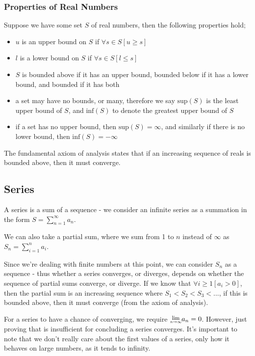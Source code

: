 \documentclass[a4paper, 12pt]{article}
\newcommand{\limit}[2]{\raisebox{0.5ex}{\scalebox{0.8}{$\displaystyle{\lim_{#1 \to #2}}$}}}
\newcommand{\summation}[3]{\sum\limits_{#1}^{#2} #3}
\begin{document}
            \subsubsection*{Properties of Real Numbers}
                Suppose we have some set $S$ of real numbers, then the following properties hold;
                \begin{itemize}
                    \itemsep0em
                    \item $u$ is an upper bound on $S$ if $\forall s \in S [u \geq s]$
                    \item $l$ is a lower bound on $S$ if $\forall s \in S [l \leq s]$
                    \item $S$ is bounded above if it has an upper bound, bounded below if it has a lower bound, and bounded if it has both
                    \item a set may have no bounds, or many, therefore we say $\text{sup}(S)$ is the least upper bound of $S$, and $\text{inf}(S)$ to denote the greatest upper bound of $S$
                    \item if a set has no upper bound, then $\text{sup}(S) = \infty$, and similarly if there is no lower bound, then $\text{inf}(S) = -\infty$
                \end{itemize}
                The fundamental axiom of analysis states that if an increasing sequence of reals is bounded above, then it must converge.
        \subsection*{Series}
            A series is a sum of a sequence - we consider an infinite series as a summation in the form $S = \summation{n = 1}{\infty}{a_n}$.
            \smallskip

            We can also take a partial sum, where we sum from 1 to $n$ instead of $\infty$ as $S_n = \summation{i = 1}{n}{a_i}$.
            \medskip

            Since we're dealing with finite numbers at this point, we can consider $S_n$ as a sequence - thus whether a series converges, or diverges, depends on whether the sequence of partial sums converge, or diverge. If we know that $\forall i \geq 1 [a_i > 0]$, then the partial sum is an increasing sequence where $S_1 < S_2 < S_3 < ...$, if this is bounded above, then it must converge (from the axiom of analysis).
            \medskip

            For a series to have a chance of converging, we require $\limit{n}{\infty}a_n = 0$. However, just proving that is insufficient for concluding a series converges. It's important to note that we don't really care about the first values of a series, only how it behaves on large numbers, as it tends to infinity.
            \smallskip
\end{document}
